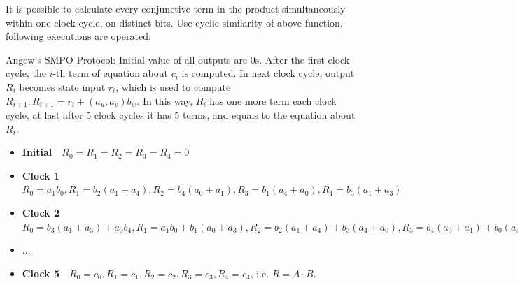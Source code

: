 It is possible to calculate every conjunctive term in the product simultaneously within one clock cycle,
on distinct bits. 
Use cyclic similarity of above function, following executions are operated: 
\begin{Example}
Angew's SMPO Protocol: Initial value of all outputs are 0s. After the first clock cycle, the $i$-th
term of equation about $c_i$ is computed. In next clock cycle, output $R_i$ becomes state input $r_i$, which
is used to compute $R_{i+1}: R_{i+1} = r_i + (a_u,a_v)b_w$. In this way, $R_i$ has one more term each clock cycle,
at last after 5 clock cycles it has 5 terms, and equals to the equation about $R_i$.
\begin{itemize}
\item \textbf{Initial}\ \ $R_0 = R_1 = R_2 = R_3 = R_4 = 0$
\item \textbf{Clock 1}\ \ $R_0 = a_1b_0, R_1 = b_2(a_1 + a_4), R_2 = b_4(a_0 + a_1), R_3 = b_1(a_4 + a_0), 
			R_4 = b_3(a_1 + a_3)$
\item \textbf{Clock 2}\ \ $R_0 = b_3(a_1 + a_3) + a_0b_4, R_1 = a_1b_0 + b_1(a_0 + a_3), R_2 = b_2(a_1 + a_4)
			+ b_3(a_4 + a_0), R_3 = b_4(a_0 + a_1) + b_0(a_3 + a_4), R_4 = b_1(a_4 + a_0) + b_2(a_0 + a_2)$
\item \textbf{$\dots$}
\item \textbf{Clock 5}\ \ $R_0 = c_0, R_1 = c_1, R_2 = c_2, R_3 = c_3, R_4 = c_4$, i.e. $R = A\cdot B$.
\end{itemize}
\end{Example}

